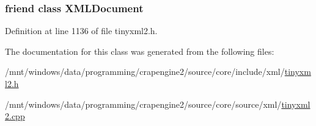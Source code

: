 \hypertarget{classtinyxml2_1_1_x_m_l_element_a4eee3bda60c60a30e4e8cd4ea91c4c6e}{
\subsubsection[{X\+M\+L\+Document}]{\setlength{\rightskip}{0pt plus 5cm}friend class {\bf X\+M\+L\+Document}\hspace{0.3cm}{\ttfamily [friend]}}}\label{classtinyxml2_1_1_x_m_l_element_a4eee3bda60c60a30e4e8cd4ea91c4c6e}


Definition at line 1136 of file tinyxml2.\+h.



The documentation for this class was generated from the following files\+:\begin{DoxyCompactItemize}
\item 
/mnt/windows/data/programming/crapengine2/source/core/include/xml/\hyperlink{tinyxml2_8h}{tinyxml2.\+h}\item 
/mnt/windows/data/programming/crapengine2/source/core/source/xml/\hyperlink{tinyxml2_8cpp}{tinyxml2.\+cpp}\end{DoxyCompactItemize}
